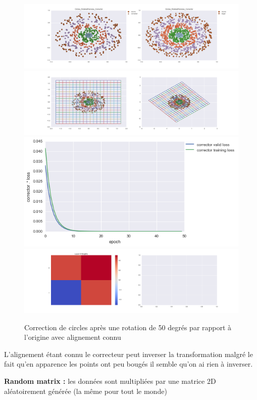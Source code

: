 \begin{figure}[H] %
\centering
\includegraphics[width=\linewidth]{fig/24-05-2016/circles/Circles_RotatedPairwise_Corrector-DATA.png}
\includegraphics[width=\linewidth]{fig/24-05-2016/circles/Circles_RotatedPairwise_Corrector-GridCheck.png}
\includegraphics[width=0.45\linewidth]{fig/24-05-2016/circles/Circles_RotatedPairwise_Corrector-Learning_curve.png}
\includegraphics[width=\linewidth]{fig/24-05-2016/circles/Circles_RotatedPairwise_Corrector-W.png}
\caption{Correction de circles après une rotation de 50 degrés par rapport à l'origine avec alignement connu}
\label{fig:recap-circles-rot-pairwise}
\end{figure}

L'alignement étant connu le correcteur peut inverser la transformation malgré le fait qu'en apparence 
les points ont peu bougés il semble qu'on ai rien à inverser.

{\Large \textbf{Random matrix :}} les données sont multipliées par une matrice 2D aléatoirement générée
 (la même pour tout le monde)

